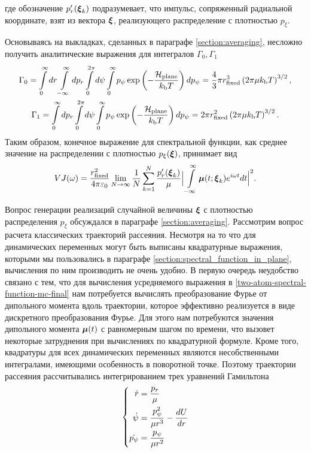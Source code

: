 %
где обозначение $p_r^\prime(\boldsymbol{\xi}_k)$ подразумевает, что импульс, сопряженный радиальной координате, взят из вектора $\boldsymbol{\xi}$, реализующего распределение с плотностью $p_\xi$. \par
Основываясь на выкладках, сделанных в параграфе \ref{section:averaging}, несложно получить аналитические выражения для интегралов $\Gamma_0, \Gamma_1$
\begin{gather}
    \Gamma_0 = \int\limits_0^\infty dr \int\limits_{-\infty}^\infty dp_r \int\limits_0^{2\pi} d\psi \int\limits_0^\infty p_\psi \exp \left( -\frac{\mathcal{H}_\text{plane}}{k_\text{b} T} \right) d p_\psi = \frac{4}{3} \pi r_\text{fixed}^3 \left( 2 \pi \mu k_\text{b} T \right)^{3/2}, \\
    \Gamma_1 = \int\limits_0^\infty dp_r \int\limits_0^{2\pi} d\psi \int\limits_0^\infty p_\psi \exp \left( -\frac{\mathcal{H}_\text{plane}}{k_\text{b} T} \right) dp_\psi  = 2 \pi r_\text{fixed}^2 \left( 2 \pi \mu k_\text{b} T \right)^{3/2}.
\end{gather}
Таким образом, конечное выражение для спектральной функции, как среднее значение на распределении с плотностью $p_\xi(\boldsymbol{\xi})$, принимает вид 
\begin{gather}
    VJ(\omega) = \frac{r_\text{fixed}^2}{4 \pi \varepsilon_0} \lim_{N \rightarrow \infty} \frac{1}{N} \sum_{k = 1}^N \frac{p_r^\prime(\boldsymbol{\xi}_k)}{\mu} \Big\vert \int\limits_{-\infty}^\infty \boldsymbol{\mu}(t; \boldsymbol{\xi}_k) e^{i \omega t} dt \Big\vert^2. \label{two-atom-spectral-function-mc-final}
\end{gather}

Вопрос генерации реализаций случайной величины $\boldsymbol{\xi}$ с плотностью распределения $p_\xi$ обсуждался в параграфе \ref{section:averaging}. Рассмотрим вопрос расчета классических траекторий рассеяния. Несмотря на то что для динамических переменных могут быть выписаны квадратурные выражения, которыми мы пользовались в параграфе \ref{section:spectral_function_in_plane}, вычисления по ним производить не очень удобно. В первую очередь неудобство связано с тем, что для вычисления усредняемого выражения в \eqref{two-atom-spectral-function-mc-final} нам потребуется вычислять преобразование Фурье от дипольного момента вдоль траектории, которое эффективно реализуется в виде дискретного преобразования Фурье. Для этого нам потребуются значения дипольного момента $\boldsymbol{\mu}(t)$ с равномерным шагом по времени, что вызовет некоторые затруднения при вычислениях по квадратурной формуле. Кроме того, квадратуры для всех динамических переменных являются несобственными интегралами, имеющими особенность в поворотной точке. Поэтому траектории рассеяния рассчитывались интегрированием трех уравнений Гамильтона
\begin{gather}
    \left\{
    \begin{aligned}
        \dot{r} &= \frac{p_r}{\mu} \\
        \dot{\psi} &= \frac{p_\psi^2}{\mu r^3} - \frac{d U}{d r} \\
        \dot{p_\psi} &= \frac{p_\psi}{\mu r^2}
    \end{aligned}
    \right. \label{two-atom-hamilton-equations}
\end{gather}

